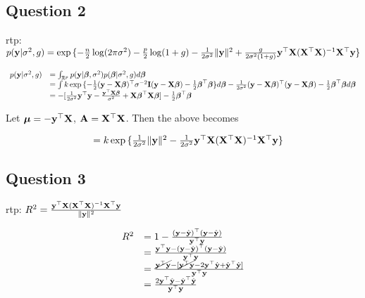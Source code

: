 \documentclass{amsart}[12pt]
\begin{document}
\subsection{Question 2}

rtp: $p({\bf y} | \sigma^2, g) = \exp{\{ - \frac{n}{2} \log (2 \pi \sigma^2) - \frac{p}{2} \log(1 + g) - \frac{1}{2 \sigma^2} \| {\bf y}\|^2  + \frac{g}{2 \sigma^2 (1 + g)} {\bf y}^\top {\bf X}({\bf X}^\top {\bf X})^{-1} {\bf X}^\top {\bf y}\}}$

\begin{equation*}
\begin{array}{ll}
p({\bf y} | \sigma^2, g) &= \int_{{\mathbb R}^p} p({\bf y} | {\boldsymbol \beta}, \sigma^2) p({\boldsymbol \beta} | \sigma^2, g) d {\boldsymbol \beta} \\
&= \int k \exp{\{ - \tfrac{1}{2} ({\bf y}- {\bf X}{\boldsymbol\beta})^\top \sigma^{-2} {\bf I}({\bf y}- {\bf X}{\boldsymbol\beta}) -  \tfrac{1}{2} {\boldsymbol\beta}^\top {\boldsymbol\beta}\}} d {\boldsymbol \beta} - \frac{1}{2 \sigma^2} ({\bf y} - {\bf X} {\boldsymbol \beta})^\top ({\bf y} - {\bf X} {\boldsymbol \beta}) -\tfrac{1}{2} {\boldsymbol \beta}^\top {\boldsymbol\beta} d {\boldsymbol \beta} \\
&= -[\frac{1}{2 \sigma^2} {\bf y}^\top {\bf y} - \frac{{\bf y}^\top {\bf X} {\boldsymbol\beta}}{\sigma^2} + {\bf X} {\boldsymbol \beta}^\top {\bf X} {\boldsymbol\beta}] - \tfrac{1}{2} {\boldsymbol \beta}^\top {\boldsymbol\beta}
\end{array}
\end{equation*}

Let ${\boldsymbol \mu} = -{\bf y}^\top {\bf X}$, ${\bf A} = {\bf X}^\top {\bf X}$. Then the above becomes

\begin{equation*}
\begin{array}{ll}
&= k \exp{ \{ \frac{1}{2 \sigma^2} \| {\bf y}\|^2 - \frac{1}{2 \sigma^2} {\bf y}^\top {\bf X}({\bf X}^\top {\bf X})^{-1} {\bf X}^\top {\bf y}\} }
\end{array}
\end{equation*}

\subsection{Question 3}

rtp: $R^2 = \frac{{\bf y}^\top {\bf X} ({\bf X}^\top {\bf X})^{-1} {\bf X}^\top {\bf y}}{\| {\bf y} \|^2}$

\begin{equation*}
\begin{array}{ll}
R^2 &= 1 - \frac{({\bf y} - \hat{{\bf y}})^\top ({\bf y} - \hat{{\bf y}})}{{\bf y}^\top {\bf y}} \\
&= \frac{{\bf y}^\top {\bf y} - ({\bf y} - \hat{{\bf y}})^\top ({\bf y} - \hat{{\bf y}})}{{\bf y}^\top {\bf y}} \\
&= \frac{\cancel{{\bf y}^\top {\bf y}} - [\cancel{{\bf y}^\top {\bf y}} - 2 {\bf y}^\top \hat{{\bf y}} + \hat{{\bf y}}^\top \hat{{\bf y}}]}{{\bf y}^\top {\bf y}} \\
&= \frac{2 {\bf y}^\top \hat{{\bf y}} - \hat{{\bf y}}^\top \hat{{\bf y}}}{{\bf y}^\top {\bf y}}
\end{array}
\end{equation*}
\end{document}
